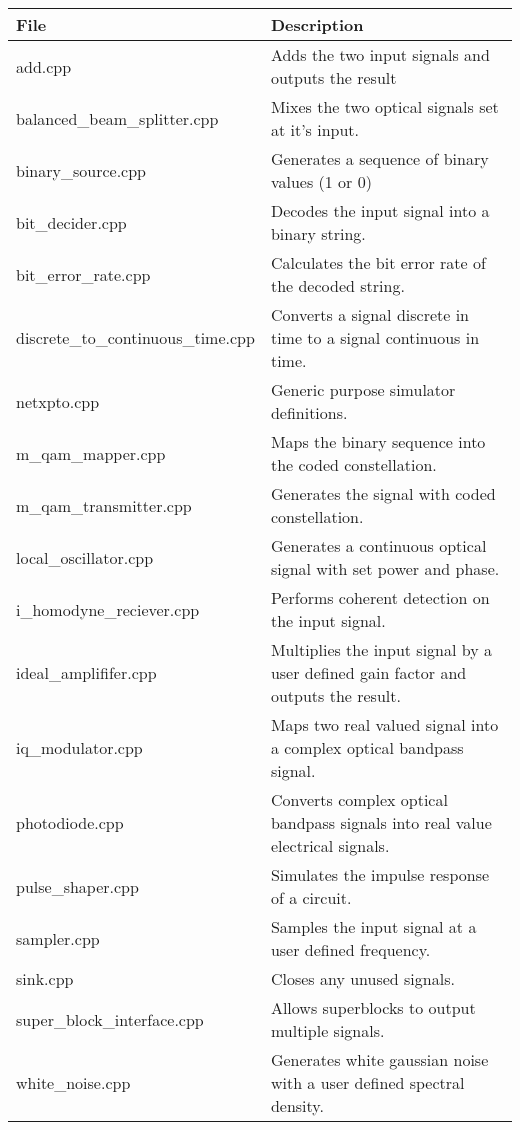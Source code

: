 \begin{table}[H]
\centering
\begin{tabulary}{1.0\textwidth}{|p{6cm}|L|}
\hline
\textbf{File}              & \textbf{Description} 				                  \\ \hline
add.cpp                      & Adds the two input signals and outputs the result    \\ \hline
balanced\_beam\_splitter.cpp & Mixes the two optical signals set at it's input.     \\ \hline
binary\_source.cpp           & Generates a sequence of binary values (1 or 0)       \\ \hline
bit\_decider.cpp            & Decodes the input signal into a binary string.       \\ \hline
bit\_error\_rate.cpp         & Calculates the bit error rate of the decoded string. \\ \hline
discrete\_to\_continuous\_time.cpp &  Converts a signal discrete in time to a signal continuous in time. \\ \hline
netxpto.cpp                  & Generic purpose simulator definitions.	              \\ \hline
m\_qam\_mapper.cpp           & Maps the binary sequence into the coded constellation. \\ \hline
m\_qam\_transmitter.cpp      & Generates the signal with coded constellation.       \\ \hline
local\_oscillator.cpp        & Generates a continuous optical signal with set power and phase. \\ \hline
i\_homodyne\_reciever.cpp    & Performs coherent detection on the input signal.     \\ \hline
ideal\_amplififer.cpp        & Multiplies the input signal by a user defined gain factor and outputs the result. \\ \hline
iq\_modulator.cpp            & Maps two real valued signal into a complex optical bandpass  signal. \\ \hline
photodiode.cpp               & Converts complex optical bandpass signals into real value electrical signals. \\ \hline
pulse\_shaper.cpp            & Simulates the impulse response of a circuit.          \\ \hline
sampler.cpp                  & Samples the input signal at a user defined frequency. \\ \hline
sink.cpp                     & Closes any unused signals.                           \\ \hline
super\_block\_interface.cpp  & Allows superblocks to output multiple signals.       \\ \hline
white\_noise.cpp             & Generates white gaussian noise with a user defined spectral density.\\ \hline
\end{tabulary}
\end{table}		

